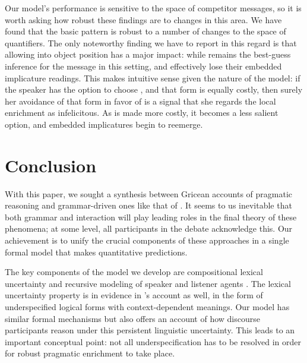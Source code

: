 \documentclass[leqno,12pt]{article}
\begin{document}
Our model's performance is sensitive to the space of competitor
messages, so it is worth asking how robust these findings are to
changes in this area. We have found that the basic pattern is robust
to a number of changes to the space of quantifiers.  The only
noteworthy finding we have to report in this regard is that allowing
 into object position has a major impact: while
 remains the best-guess inference for the message
 in this setting,  and
 effectively lose their embedded implicature
readings.  This makes intuitive sense given the nature of the model:
if the speaker has the option to choose ,
and that form is equally costly, then surely her avoidance of that
form in favor of  is a signal that she regards
the local enrichment as infelicitous. As  is made more
costly, it becomes a less salient option, and embedded implicatures
begin to reemerge.


\section{Conclusion}\label{sec:conclusion}

With this paper, we sought a synthesis between Gricean accounts of
pragmatic reasoning and grammar-driven ones like that of
\citet{ChierchiaFoxSpector08}. It seems to us inevitable that both
grammar and interaction will play leading roles in the final theory of
these phenomena; at some level, all participants in the debate
acknowledge this. Our achievement is to unify the crucial components
of these approaches in a single formal model that makes quantitative
predictions.

The key components of the model we develop are compositional lexical
uncertainty and recursive modeling of speaker and listener agents
\citep{Bergen:Levy:Goodman:2014}. The lexical uncertainty property is
in evidence in \citeauthor{ChierchiaFoxSpector08}'s account as well,
in the form of underspecified logical forms with context-dependent
meanings. Our model has similar formal mechanisms but also offers an
account of how discourse participants reason under this persistent
linguistic uncertainty. This leads to an important conceptual point:
not all underspecification has to be resolved in order for robust
pragmatic enrichment to take place.
\end{document}

